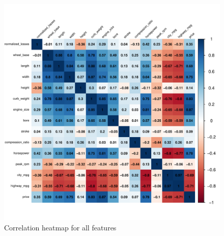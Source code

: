 \documentclass[11pt,a4paper]{article}\usepackage[]{graphicx}\usepackage[]{xcolor}
\makeatletter
\def\maxwidth{ %
  \ifdim\Gin@nat@width>\linewidth
    \linewidth
  \else
    \Gin@nat@width
  \fi
}
\newenvironment{knitrout}{}{} %
\makeatother
\begin{document}
	
	
\begin{knitrout}
\color{fgcolor}\begin{figure}
\includegraphics[width=\maxwidth]{figure/corr_plot-1} \caption[Correlation heatmap for all features]{Correlation heatmap for all features}\label{fig:corr_plot}
\end{figure}

\end{knitrout}
	
\end{document}
